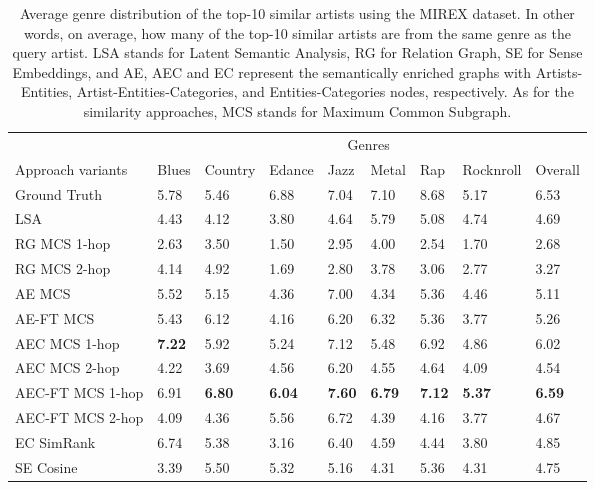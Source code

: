 \begin{table}[ht!]
\centering
	\begin{tabular}{ lllllllll }
 	\toprule
& \multicolumn{8}{c}{Genres} \\
\cmidrule(lr){2-9}
	Approach variants & Blues & Country & Edance & Jazz & Metal & Rap & Rocknroll & Overall\\
	\midrule
Ground Truth & 5.78 & 5.46 & 6.88 & 7.04 & 7.10 & 8.68 & 5.17 & 6.53\\
\midrule[.2pt]
LSA & 4.43 & 4.12 & 3.80 & 4.64 & 5.79 & 5.08 & 4.74 & 4.69\\
RG MCS 1-hop & 2.63 & 3.50 & 1.50 & 2.95 & 4.00 & 2.54 & 1.70 &  2.68\\
RG MCS 2-hop & 4.14 & 4.92 & 1.69 & 2.80 & 3.78 & 3.06 & 2.77 & 3.27\\
AE MCS & 5.52 & 5.15 & 4.36 & 7.00 & 4.34 & 5.36 & 4.46 & 5.11\\
AE-FT MCS & 5.43 & 6.12 & 4.16 & 6.20 & 6.32 & 5.36 & 3.77 & 5.26 \\
AEC MCS 1-hop & \textbf{7.22} & 5.92 & 5.24 & 7.12 & 5.48 & 6.92 & 4.86 & 6.02 \\
AEC MCS 2-hop & 4.22 & 3.69 & 4.56 & 6.20 & 4.55 & 4.64 & 4.09 & 4.54 \\
AEC-FT MCS 1-hop & 6.91 & \textbf{6.80} & \textbf{6.04} & \textbf{7.60} & \textbf{6.79} & \textbf{7.12} & \textbf{5.37} & \textbf{6.59} \\
AEC-FT MCS 2-hop & 4.09 & 4.36 & 5.56 & 6.72 & 4.39 & 4.16 & 3.77 & 4.67 \\
EC SimRank & 6.74 & 5.38 & 3.16 & 6.40 & 4.59 & 4.44 & 3.80 & 4.85 \\
SE Cosine & 3.39 & 5.50 & 5.32 & 5.16 & 4.31 & 5.36 & 4.31 & 4.75 \\
\bottomrule	
	\end{tabular}
	\caption{Average genre distribution of the top-10 similar artists using the MIREX dataset. In other words, on average, how many of the top-10 similar artists are from the same genre as the query artist. LSA stands for Latent Semantic Analysis, RG for Relation Graph, SE for Sense Embeddings,  and AE, AEC and EC represent the semantically enriched graphs with Artists-Entities, Artist-Entities-Categories, and Entities-Categories nodes, respectively. As for the similarity approaches, MCS stands for Maximum Common Subgraph.}	
	\label{tbl:similarity:res_genre_distrib}
\end{table}


